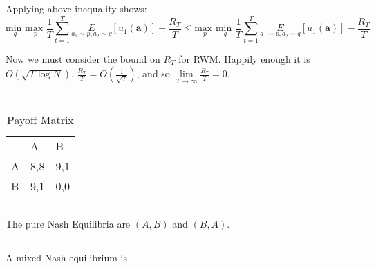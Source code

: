 \documentclass[]{article}
\begin{document}
\noindent Applying above inequality shows:
\begin{equation}
	\underset{q}{\text{min }}\underset{p}{\text{max }}\frac{1}{T}\sum_{t=1}^{T}\underset{a_1 \sim p, a_2 \sim q}{E}\left[u_1\left(\textbf{a}\right)\right] - \frac{R_T}{T}
	\le
	\underset{p}{\text{max }}\underset{q}{\text{min }}\frac{1}{T}\sum_{t=1}^{T}\underset{a_1 \sim p, a_2 \sim q}{E}\left[u_1\left(\textbf{a}\right)\right] - \frac{R_T}{T}
\end{equation}

\noindent Now we must consider the bound on $R_T$ for RWM. Happily enough it is $O\left(\sqrt{T \log N}\right)$, $\frac{R_T}{T} = O\left(\frac{1}{\sqrt{T}}\right)$, and so $\lim\limits_{T \rightarrow \infty} \frac{R_T}{T} = 0$.

\section{}
\begin{table}[H]
	\centering
	\caption{Payoff Matrix}
	\label{fig:C3}
	\begin{tabular}{lll}
		& A                        & B                        \\ \cline{2-3} 
		\multicolumn{1}{l|}{A} & \multicolumn{1}{l|}{8,8} & \multicolumn{1}{l|}{9,1} \\ \cline{2-3} 
		\multicolumn{1}{l|}{B} & \multicolumn{1}{l|}{9,1} & \multicolumn{1}{l|}{0,0} \\ \cline{2-3} 
	\end{tabular}
\end{table}
\subsection{}
The pure Nash Equilibria are $\left( A, B \right)$ and $\left( B, A \right)$.
\subsection{}
A mixed Nash equilibrium is 
\subsection{}
\end{document}
